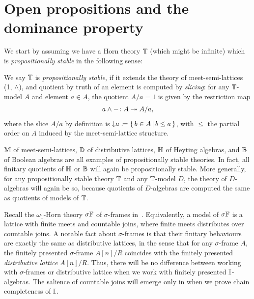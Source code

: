 \section{Open propositions and the dominance property}\label{sec:dominance}

We start by assuming we have a Horn theory $\mathbb{T}$ (which might be infinite) which is \emph{propositionally stable} in the following sense: 

\begin{definition}\label{defn:propositional}
  We say $\mathbb{T}$ is \emph{propositionally stable}, if it extends the theory of meet-semi-lattices (1, $\wedge$), and quotient by truth of an element is computed by \emph{slicing}: for any $\mathbb{T}$-model $A$ and element $a\in A$, the quotient $A/a=1$ is given by the restriction map
  \[ {a \wedge -} \colon A \twoheadrightarrow A/a\text{,} \]
  where the slice $A/a$ by definition is ${\operatorname{\downarrow}} a \coloneq \left\{\,b\in A\,\middle|\,b\le a\,\right\}$, with $\le$ the partial order on $A$ induced by the meet-semi-lattice structure.
\end{definition}

\begin{remark}
  $\mathbb{M}$ of meet-semi-lattices, $\mathbb{D}$ of distributive lattices, $\mathbb{H}$ of Heyting algebras, and $\mathbb{B}$ of Boolean algebras are all examples of propositionally stable theories. In fact, all finitary quotients of $\mathbb{H}$ or $\mathbb{B}$ will again be propositionally stable. More generally, for any propositionally stable theory $\mathbb{T}$ and any $\mathbb{T}$-model $D$, the theory of $D$-algebras will again be so, because quotients of $D$-algebras are computed the same as quotients of models of $\mathbb{T}$.
\end{remark}

\begin{remark}\label{rem:sigmaframe}
  Recall the $\omega_1$-Horn theory $\sigma\mathbb{F}$ of $\sigma$-frames in~. Equivalently, a model of $\sigma\mathbb{F}$ is a lattice with finite meets and countable joins, where finite meets distributes over countable joins. A notable fact about $\sigma$-frames is that their finitary behaviours are exactly the same as distributive lattices, in the sense that for any $\sigma$-frame $A$, the finitely presented $\sigma$-frame $A[n]/R$ coincides with the finitely presented \emph{distributive lattice} $A[n]/R$. Thus, there will be no difference between working with $\sigma$-frames or distributive lattice when we work with finitely presented $\mathbb{I}$-algebras. The salience of countable joins will emerge only in  when we prove chain completeness of $\mathbb{I}$.
\end{remark}

